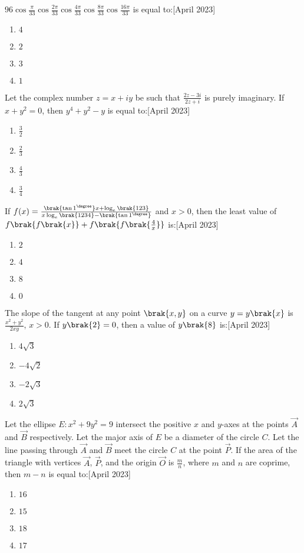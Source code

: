 \iffalse
\title{2023}
\author{ee24btech11009}
\section{mcq-single}
\fi
\item $96\cos \frac{\pi}{33} \cos\frac{2\pi}{33} \cos\frac{4\pi}{33} \cos\frac{8\pi}{33} \cos\frac{16\pi}{33}$
is equal to:\hfill{[April 2023]}
\begin{enumerate}
    \item $4$
    \item $2$
    \item $3$
    \item $1$
\end{enumerate}
\item Let the complex number $z = x + iy$ be such that 
$\frac{2z - 3i}{2z + i}$ is purely imaginary. If $x + y^2 = 0$, then $y^4 + y^2 - y$ is equal to:\hfill{[April 2023]}
\begin{enumerate}
    \item $\frac{3}{2}$
    \item $\frac{2}{3}$
    \item $\frac{4}{3}$
    \item $\frac{3}{4}$
\end{enumerate}
\item If $f(x) = \frac{\brak{\tan 1^\degree} x + \log_e\brak{123}}{x \log_e\brak{1234}-\brak{\tan 1^\degree}}$ and $x > 0$, then the least value of 
$f\brak{f\brak{x}} + f\brak{f\brak{\frac{4}{x}}}$ is:\hfill{[April 2023]}
\begin{enumerate}
    \item $2$
    \item $4$
    \item $8$
    \item $0$
\end{enumerate}
\item The slope of the tangent at any point $\brak{x, y}$ on a curve $y = y\brak{x}$ is 
$\frac{x^2 + y^2}{2xy}$, $x > 0$. If $y\brak{2} = 0$, then a value of $y\brak{8}$ is:\hfill{[April 2023]}
\begin{enumerate}
    \item $4\sqrt{3}$
    \item $-4\sqrt{2}$
    \item $-2\sqrt{3}$
    \item $2\sqrt{3}$
\end{enumerate}
\item Let the ellipse $E: x^2 + 9y^2 = 9$ intersect the positive $x$ and $y$-axes at the points $\vec{A}$ and $\vec{B}$ respectively. Let the major axis of $E$ be a diameter of the circle $C$. Let the line passing through $\vec{A}$ and $\vec{B}$ meet the circle $C$ at the point $\vec{P}$. If the area of the triangle with vertices $\vec{A}$, $\vec{P}$, and the origin $\vec{O}$ is $\frac{m}{n}$, where $m$ and $n$ are coprime, then $m - n$ is equal to:\hfill{[April 2023]}
\begin{enumerate}
    \item $16$
    \item $15$
    \item $18$
    \item $17$
\end{enumerate}
